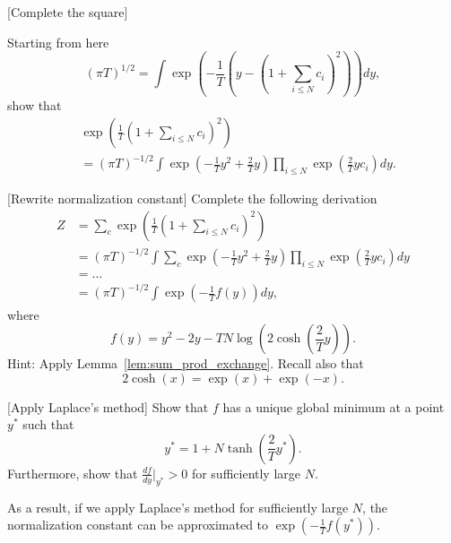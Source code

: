 \begin{exercise}{[Complete the square]}

Starting from here
%
\begin{equation}
\left(\pi T\right)^{1/2} = \int \exp\left(-\frac{1}{T}\left(y - \left(1 + \sum_{i \leq N}c_i\right)^2\right)\right)dy,
\end{equation}
%
show that
%
\begin{align*}
&\exp\left(\frac{1}{T}\left(1 + \sum_{i \leq N}c_i\right)^2\right)\\ 
&= \left(\pi T\right)^{-1/2}\int\exp\left(-\frac{1}{T}y^2 + \frac{2}{T}y\right) \prod_{i \leq N}\exp\left(\frac{2}{T}y c_i\right) dy.
\end{align*}
%
\end{exercise}

\begin{exercise}{[Rewrite normalization constant]}
Complete the following derivation
%
\begin{align}
Z &= \sum_{c} \exp\left(\frac{1}{T}\left(1 + \sum_{i \leq N}c_i\right)^2\right)\\ 
&= \left(\pi T\right)^{-1/2}\int\sum_{c}\exp\left(-\frac{1}{T}y^2 + \frac{2}{T}y\right) \prod_{i \leq N}\exp\left(\frac{2}{T}y c_i\right) dy\\
&= \ldots \\
&= \left(\pi T\right)^{-1/2}\int \exp\left(-\frac{1}{T}f(y)\right) dy,\label{eq:norm_cost_ugly_integral}
\end{align}
%
where
%
\begin{equation}
f(y) = y^2 - 2 y - T N \log \left(2 \cosh\left(\frac{2}{T}y\right)\right).
\end{equation}
%
Hint: Apply Lemma~\ref{lem:sum_prod_exchange}. Recall also that
%
\begin{equation}
2 \cosh(x) = \exp(x) + \exp(-x).
\end{equation}
%
\end{exercise}

\begin{exercise}{[Apply Laplace's method]}
Show that $f$ has a unique global minimum at a point $y^*$ such that
%
\begin{equation}
y^* = 1 + N \tanh\left(\frac{2}{T}y^*\right).
\end{equation}
% 
Furthermore, show that $\frac{df}{dy}\bigr|_{y^*} > 0$ for sufficiently large $N$.
\end{exercise}

As a result, if we apply Laplace's method for sufficiently large $N$, the normalization constant can be approximated to $\exp\left(-\frac{1}{T}f(y^*)\right)$.
%
%

